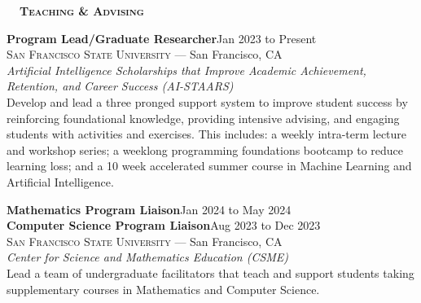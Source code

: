 \documentclass[hidelinks, 10pt]{article}
\def\contentwidth{0.9\linewidth}    %
\def\contentblockspacing{2.5mm}     %
\def\contentheaderspacing{1mm}      %
\def\sectionspacing{8mm}            %
\def\sectiontocontentspacing{4mm}   %
\renewcommand{\section}[1]{
    {\fontsize{14}{14}\selectfont \textsc{\textbf{\ \ #1\ \ }}}\hrulefill
}
\begin{document}
{\vspace{\sectionspacing}


\section{Teaching \& Advising}

\vspace{\sectiontocontentspacing}

\begin{minipage}[ct]{\contentwidth}
    \textbf{Program Lead/Graduate Researcher}\hfill Jan 2023 to Present\\
    {\textsc{San Francisco State University} --- San Francisco, CA}\\
    \textit{Artificial Intelligence Scholarships that Improve Academic Achievement, Retention, and Career Success (AI-STAARS)}
    \vspace{\contentheaderspacing}\\
    Develop and lead a three pronged support system to improve student success by reinforcing foundational knowledge, providing intensive
    advising, and engaging students with activities and exercises. This includes: a weekly intra-term lecture and workshop series; a weeklong
    programming foundations bootcamp to reduce learning loss; and a 10 week accelerated summer course in Machine Learning and
    Artificial Intelligence.
\end{minipage}

\vspace{\contentblockspacing}

\begin{minipage}[ct]{\contentwidth}
    \textbf{Mathematics Program Liaison}\hfill Jan 2024 to May 2024\\
    \textbf{Computer Science Program Liaison}\hfill Aug 2023 to Dec 2023\\
    {\textsc{San Francisco State University} --- San Francisco, CA}\\
    \textit{Center for Science and Mathematics Education (CSME)}
    \vspace{\contentheaderspacing}\\
    Lead a team of undergraduate facilitators that teach and support students taking supplementary courses in Mathematics and Computer
    Science.
\end{minipage}

}
\end{document}
